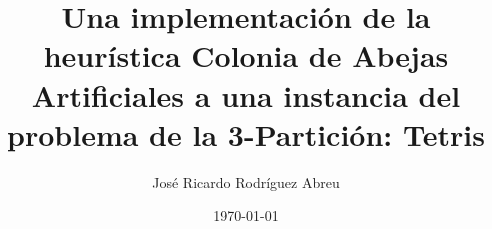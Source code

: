 \documentclass{beamer}
\title[ABC implementado en Tetris]{Una implementación de la heurística Colonia de Abejas
Artificiales a una instancia del problema de la 3-Partición: 
Tetris}
\author{José Ricardo Rodríguez Abreu}
\institute[UNAM]{Universidad Nacional Autónoma de México}
\date{\AdvanceDate[+1]\today}
\begin{document}
 
\begin{frame}
\titlepage
\end{frame}
























\end{document}
